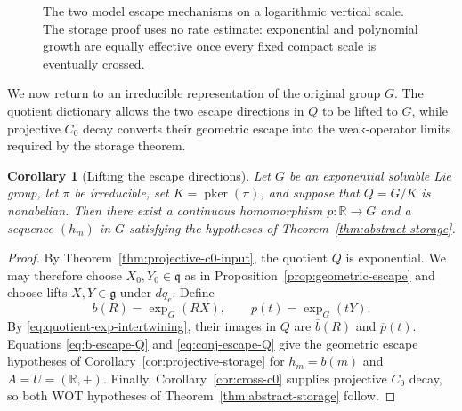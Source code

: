\documentclass[reqno]{amsart}
\numberwithin{equation}{section}
\newtheorem{corollary}[theorem]{Corollary}
\theoremstyle{definition}
\theoremstyle{remark}
\newcommand{\R}{\mathbb R}
\newcommand{\pker}{\operatorname{pker}}
\newcommand{\e}{\mathrm e}
\begin{document}
\begin{figure}[t]
\centering
{}
\caption{The two model escape mechanisms on a logarithmic vertical scale.
The storage proof uses no rate estimate: exponential and polynomial growth
are equally effective once every fixed compact scale is eventually crossed.}
\label{fig:escape-rates}
\end{figure}

We now return to an irreducible representation of the original group $G$.
The quotient dictionary allows the two escape directions in $Q$ to be lifted
to $G$, while projective $C_0$ decay converts their geometric escape into the
weak-operator limits required by the storage theorem.

\begin{corollary}[Lifting the escape directions]
\label{cor:lifted-escape}
Let $G$ be an exponential solvable Lie group, let $\pi$ be irreducible, set
$K=\pker(\pi)$, and suppose that $Q=G/K$ is nonabelian.  Then there exist
a continuous homomorphism $p:\R\to G$ and a sequence $(h_m)$ in $G$
satisfying the hypotheses of Theorem~\ref{thm:abstract-storage}.
\end{corollary}

\begin{proof}
By Theorem~\ref{thm:projective-c0-input}, the quotient $Q$ is exponential.
We may therefore choose
$X_0,Y_0\in\mathfrak q$ as in Proposition~\ref{prop:geometric-escape} and
choose lifts $X,Y\in\mathfrak g$ under $dq_e$.  Define
\[
 b(R)=\exp_G(RX),
 \qquad p(t)=\exp_G(tY).
\]
By \eqref{eq:quotient-exp-intertwining}, their images in $Q$ are
$\overline b(R)$ and $\overline p(t)$.  Equations
\eqref{eq:b-escape-Q} and \eqref{eq:conj-escape-Q} give the geometric escape
hypotheses of Corollary~\ref{cor:projective-storage} for $h_m=b(m)$ and
$A=U=(\R,+)$.  Finally, Corollary~\ref{cor:cross-c0} supplies projective
$C_0$ decay, so both WOT hypotheses of
Theorem~\ref{thm:abstract-storage} follow.
\end{proof}
\end{document}
